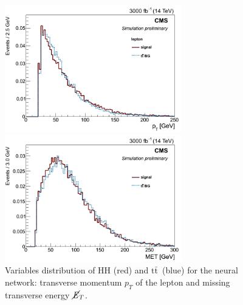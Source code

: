 \documentclass[10pt,a4paper]{article}
\newcommand{\ww}{7.7cm} %
\newcommand{\dd}{-2mm} %
\renewcommand{\tt}{\ensuremath{\text{t}\bar{\text{t}}}}
\newcommand{\MET}{\ensuremath{\cancel{\it{E}}_{T}}}
\begin{document}
\begin{figure}[h]
    \begin{minipage}[h!]{\ww}
      \centering
      \includegraphics[width=\ww]{figs/leptonPt.png}
    \end{minipage}
    \begin{minipage}[h!]{\ww}
      \centering
      \includegraphics[width=\ww]{figs/MET.png}
    \end{minipage}
  \vspace{\dd}
  \caption{Variables distribution of HH (red) and \tt\ (blue) for the neural network: transverse momentum $p_T$ of the lepton and missing transverse energy \MET.} \label{vars1}
\end{figure}
\end{document}
